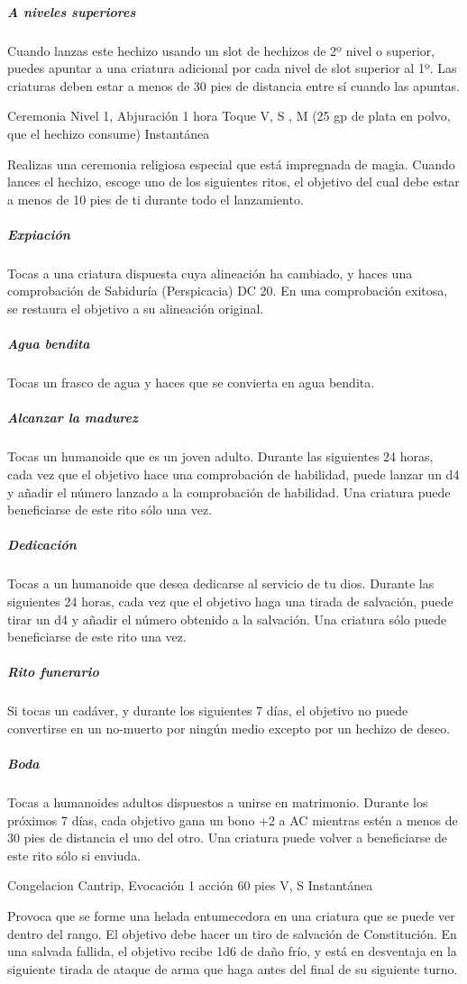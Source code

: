 \documentclass[a4paper,twocolumn,openany,10pt]{dndbook}
\begin{document}
	\subparagraph{A niveles superiores} Cuando lanzas este hechizo usando un slot de hechizos de 2º nivel o superior, puedes
	apuntar a una criatura adicional por cada nivel de slot superior al 1º. Las criaturas deben estar a menos de 30 pies de
	distancia entre sí cuando las apuntas.

\spellheader%
	{Ceremonia}
	{Nivel 1, Abjuración}
	{1 hora}
	{Toque}
	{V, S , M (25 gp de plata en polvo, que el hechizo consume)}
	{Instantánea}
	
	Realizas una ceremonia religiosa especial que está impregnada de magia. Cuando lances el hechizo, escoge uno de los
	siguientes ritos, el objetivo del cual debe estar a menos de 10 pies de ti durante todo el lanzamiento.

	\subparagraph{Expiación} Tocas a una criatura dispuesta cuya alineación ha cambiado, y haces una comprobación de Sabiduría
	(Perspicacia) DC 20. En una comprobación exitosa, se restaura el objetivo a su alineación original.

	\subparagraph{Agua bendita} Tocas un frasco de agua y haces que se convierta en agua bendita.

	\subparagraph{Alcanzar la madurez} Tocas un humanoide que es un joven adulto. Durante las siguientes 24 horas, cada vez que
	el objetivo hace una comprobación de habilidad, puede lanzar un d4 y añadir el número lanzado a la comprobación de
	habilidad. Una criatura puede beneficiarse de este rito sólo una vez.

	\subparagraph{Dedicación} Tocas a un humanoide que desea dedicarse al servicio de tu dios. Durante las siguientes 24 horas,
	cada vez que el objetivo haga una tirada de salvación, puede tirar un d4 y añadir el número obtenido a la salvación. Una
	criatura sólo puede beneficiarse de este rito una vez.

	\subparagraph{Rito funerario} Si tocas un cadáver, y durante los siguientes 7 días, el objetivo no puede convertirse en un
	no-muerto por ningún medio excepto por un hechizo de deseo.

	\subparagraph{Boda} Tocas a humanoides adultos dispuestos a unirse en matrimonio. Durante los próximos 7 días, cada objetivo
	gana un bono +2 a AC mientras estén a menos de 30 pies de distancia el uno del otro. Una criatura puede volver a
	beneficiarse de este rito sólo si enviuda. 

\spellheader%
	{Congelacion}
	{Cantrip, Evocación}
	{1 acción}
	{60 pies}
	{V, S}
	{Instantánea}
	
	Provoca que se forme una helada entumecedora en una criatura que se puede ver dentro del rango. El objetivo debe hacer un
	tiro de salvación de Constitución. En una salvada fallida, el objetivo recibe 1d6 de daño frío, y está en desventaja en la
	siguiente tirada de ataque de arma que haga antes del final de su siguiente turno. 
	
\end{document}
